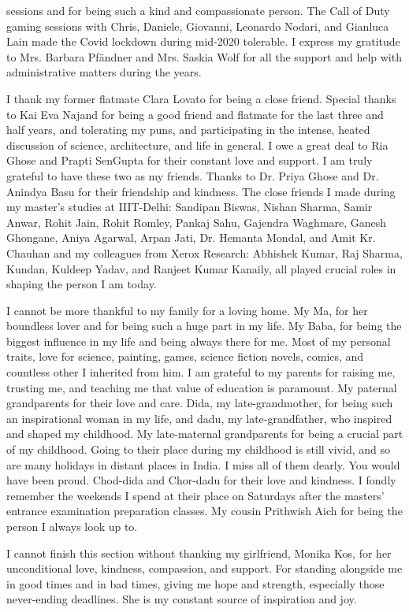 sessions and for being such a kind and compassionate person. The Call of Duty gaming sessions with Chris, Daniele, Giovanni, Leonardo Nodari, and Gianluca Lain made the Covid lockdown during mid-2020 tolerable. I express my gratitude to Mrs. Barbara Pf\"andner and Mrs. Saskia Wolf for all the support and help with administrative matters during the years. 


I thank my former flatmate Clara Lovato for being a close friend. Special thanks to Kai Eva Najand for being a good friend and flatmate for the last three and half years, and tolerating my puns, and participating in the intense, heated discussion of science, architecture, and life in general. I owe a great deal to Ria Ghose and Prapti SenGupta for their constant love and support. I am truly grateful to have these two as my friends. Thanks to Dr. Priya Ghose and Dr. Anindya Basu for their friendship and kindness. The close friends I made during my master's studies at IIIT-Delhi: Sandipan Biswas, Nishan Sharma, Samir Anwar, Rohit Jain, Rohit Romley, Pankaj Sahu, Gajendra Waghmare, Ganesh Ghongane, Aniya Agarwal, Arpan Jati, Dr. Hemanta Mondal, and Amit Kr. Chauhan and my colleagues from Xerox Research: Abhishek Kumar, Raj Sharma, Kundan, Kuldeep Yadav, and Ranjeet Kumar Kanaily, all played crucial roles in shaping the person I am today.


I cannot be more thankful to my family for a loving home. My Ma, for her boundless lover and for being such a huge part in my life. My Baba, for being the biggest influence in my life and being always there for me. Most of my personal traits, love for science, painting, games, science fiction novels, comics, and countless other I inherited from him. I am grateful to my parents for raising me, trusting me, and teaching me that value of education is paramount. My paternal grandparents for their love and care. Dida, my late-grandmother, for being such an inspirational woman in my life, and dadu, my late-grandfather, who inspired and shaped my childhood. My late-maternal grandparents for being a crucial part of my childhood. Going to their place during my childhood is still vivid, and so are many holidays in distant places in India. I miss all of them dearly. You would have been proud. Chod-dida and Chor-dadu for their love and kindness. I fondly remember the weekends I spend at their place on Saturdays after the masters' entrance examination preparation classes. My cousin Prithwish Aich for being the person I always look up to.

I cannot finish this section without thanking my girlfriend, Monika Kos, for her unconditional love, kindness, compassion, and support. For standing alongside me in good times and in bad times, giving me hope and strength, especially those never-ending deadlines. She is my constant source of inspiration and joy.

